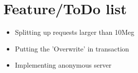 \section{Feature/ToDo list}
\begin{itemize}
  \item Splitting up requests larger than 10Meg
  \item Putting the 'Overwrite' in transaction
  \item Implementing anonymous server
\end{itemize}
